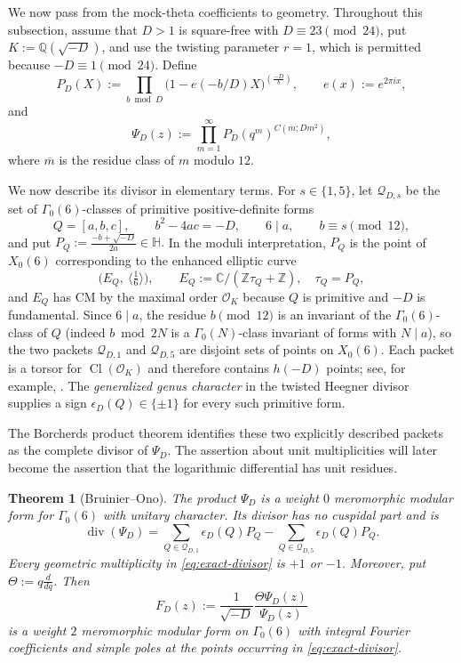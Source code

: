 \documentclass[11pt]{amsart}
\newtheorem{theorem}{Theorem}
\theoremstyle{remark}
\numberwithin{equation}{section}
\newcommand{\C}{\mathbb C}
\newcommand{\Q}{\mathbb Q}
\newcommand{\Z}{\mathbb Z}
\newcommand{\cO}{\mathcal O}
\newcommand{\cQ}{\mathcal Q}
\newcommand{\Cl}{\operatorname{Cl}}
\newcommand{\leg}[2]{\left(\frac{#1}{#2}\right)}
\begin{document}
We now pass from the mock-theta coefficients to geometry.  Throughout this
subsection, assume that $D>1$ is square-free with
$D\equiv23\pmod{24}$, put $K:=\Q(\sqrt{-D})$, and use the twisting
parameter $r=1$, which is permitted because $-D\equiv1\pmod{24}$.  Define
\begin{equation}\label{eq:PD}
 P_D(X):=\prod_{b\bmod D}
 \bigl(1-e(-b/D)X\bigr)^{\leg{-D}{b}},
 \qquad e(x):=e^{2\pi i x},
\end{equation}
and
\begin{equation}\label{eq:PsiD}
 \Psi_D(z):=\prod_{m=1}^{\infty}
 P_D(q^m)^{C(\overline m;Dm^2)},
\end{equation}
where $\overline m$ is the residue class of $m$ modulo $12$.

We now describe its divisor in elementary terms.  For $s\in\{1,5\}$, let
$\cQ_{D,s}$ be the set of $\Gamma_0(6)$-classes of primitive positive-definite
forms
\[
 Q=[a,b,c],\qquad b^2-4ac=-D,\qquad 6\mid a,\qquad b\equiv s\pmod{12},
\]
and put
$P_Q:=\frac{-b+\sqrt{-D}}{2a}\in\mathbb H.$
In the moduli interpretation, $P_Q$ is the point of $X_0(6)$ corresponding to
the enhanced elliptic curve
\[
 \bigl(E_Q,\ \langle\tfrac16\rangle\bigr),
 \qquad E_Q:=\C/(\Z\tau_Q+\Z),\quad \tau_Q=P_Q,
\]
and $E_Q$ has CM by the maximal order $\cO_K$ because $Q$ is primitive and
$-D$ is fundamental.  Since $6\mid a$, the residue $b\pmod{12}$ is an
invariant of the $\Gamma_0(6)$-class of $Q$ (indeed $b\bmod 2N$ is a
$\Gamma_0(N)$-class invariant of forms with $N\mid a$), so the two packets
$\cQ_{D,1}$ and $\cQ_{D,5}$ are disjoint sets of points on $X_0(6)$.
Each packet is a torsor for $\Cl(\cO_K)$ and therefore contains $h(-D)$
points; see, for example, \cite{GrossX0N}.  The \emph{generalized genus character}
in the twisted Heegner divisor
supplies a sign $\epsilon_D(Q)\in\{\pm1\}$ for every such primitive form.

The Borcherds product theorem identifies these two explicitly described
packets as the complete divisor of $\Psi_D$.  The assertion about unit
multiplicities will later become the assertion that the logarithmic
differential has unit residues.

\begin{theorem}[Bruinier--Ono]\label{thm:borcherds}
 The product $\Psi_D$ is a weight $0$ meromorphic modular form for
 $\Gamma_0(6)$ with unitary character.
 Its divisor has no cuspidal part and is
 \begin{equation}\label{eq:exact-divisor}
  \operatorname{div}(\Psi_D)
  =\sum_{Q\in\cQ_{D,1}}\epsilon_D(Q)P_Q
  -\sum_{Q\in\cQ_{D,5}}\epsilon_D(Q)P_Q.
 \end{equation}
 Every geometric multiplicity in \eqref{eq:exact-divisor} is $+1$ or $-1$.
Moreover, put $\Theta:=q\frac{d}{dq}$.  Then
 \begin{equation}\label{eq:FD}
  F_D(z):=\frac{1}{\sqrt{-D}}
  \frac{\Theta\Psi_D(z)}{\Psi_D(z)}
 \end{equation}
 is a weight $2$ meromorphic modular form on $\Gamma_0(6)$ with integral
 Fourier coefficients and simple poles at the points occurring in
 \eqref{eq:exact-divisor}.
\end{theorem}
\end{document}
